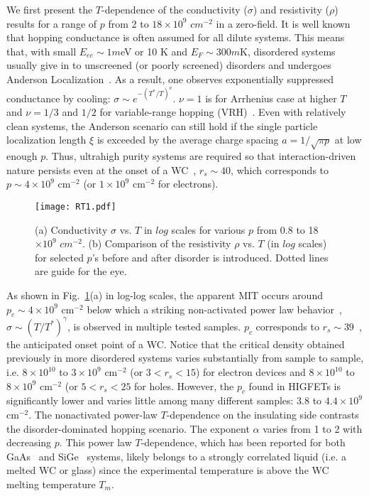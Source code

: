 \documentclass[twocolumn,secnumarabic,amssymb, nobibnotes, aps, prd]{revtex4-1}
\begin{document}
We first present the $T$-dependence of the conductivity ($\sigma$) and resistivity ($\rho$) results for a range of $p$ from 2 to $18\times10^{9}$ $cm^{-2}$ in a zero-field. It is well known that hopping conductance is often assumed for all dilute systems. This means that, with small $E_{ee}\sim 1m$eV or 10 K and $E_F\sim300 m$K, disordered systems usually give in to unscreened (or poorly screened) disorders and undergoes Anderson Localization~\cite{anderson58}. As a result, one observes exponentially suppressed conductance by cooling: $\sigma\sim e^{-(T^*/T)^\nu}$. $\nu=1$ is for Arrhenius case at higher $T$ and $\nu=1/3$ and $1/2$ for variable-range hopping (VRH)~\cite{vrh1,vrh2}. Even with relatively clean systems, the Anderson scenario can still hold if the single particle localization length $\xi$ is exceeded by the average charge spacing $a=1/\sqrt{\pi p}$ at low enough $p$. Thus, ultrahigh purity systems are required so that interaction-driven nature persists even at the onset of a WC~\cite{wc1}, $r_s\sim 40$, which corresponds to $p\sim4\times10^{9}$ cm$^{-2}$ (or $1\times10^{9}$ cm$^{-2}$ for electrons). 

\begin{figure}[b]
 \centering
 \texttt{[image: RT1.pdf]}
 \caption{\label{fig:RT} (a) Conductivity $\sigma$ vs. $T$ in $log$ scales for various $p$ from 0.8 to 18$\times10^{9}$ $cm^{-2}$. (b) Comparison of the resistivity $\rho$ vs. $T$ (in $log$ scales)  for selected $p$'s before and after disorder is introduced. Dotted lines are guide for the eye.}
\end{figure}

As shown in Fig.~\ref{fig:RT}(a) in log-log scales, the apparent MIT occurs around $p_c\sim4\times10^{9}$ cm$^{-2}$ below which a striking non-activated power law behavior~\cite{jian06,jian12}, $\sigma\sim (T/T^*)^\gamma$, is observed in multiple tested samples. $p_c$ corresponds to $r_s\sim39$~\cite{wc1}, the anticipated onset point of a WC. Notice that the critical density obtained previously in more disordered systems varies substantially from sample to sample, i.e. $8\times10^{10}$ to $3\times10^{9}$ cm$^{-2}$ (or $3<r_s<15$) for electron devices and $8\times10^{10}$ to $8\times10^{9}$ cm$^{-2}$ (or $5<r_s<25$ for holes. However, the $p_c$ found in HIGFETs is significantly lower and varies little among many different samples: 3.8 to $4.4\times10^{9}$ cm$^{-2}$. The nonactivated power-law $T$-dependence on the insulating side contrasts the disorder-dominated hopping scenario. The exponent $\alpha$ varies from 1 to 2 with decreasing $p$. This power law $T$-dependence, which has been reported for both GaAs~\cite{jian12} and SiGe~\cite{Lai} systems, likely belongs to a strongly correlated liquid (i.e. a melted WC or glass) since the experimental temperature is above the WC melting temperature $T_{m}$. 
\end{document}
